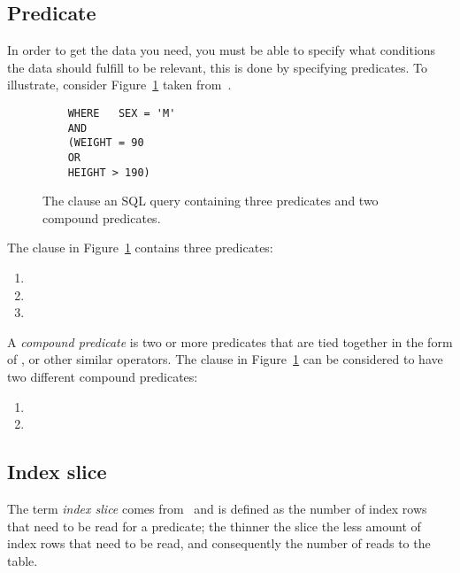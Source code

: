 \subsection*{Predicate}
In order to get the data you need, you must be able to specify what conditions
the data should fulfill to be relevant, this is done by specifying predicates.
To illustrate, consider Figure~\ref{fig:sql:predicate} taken
from~\cite{lahdenmaki_2005_relational_rdidatodossea}.

\begin{figure}[ht]
  \begin{verbatim}
    WHERE   SEX = 'M'
    AND
    (WEIGHT = 90
    OR
    HEIGHT > 190)
  \end{verbatim}
  \caption[The  clause of a query containing three predicates and two
  compound predicates]{The  clause an SQL query containing three
    predicates and two compound predicates.}\label{fig:sql:predicate}
\end{figure}

The  clause in Figure~\ref{fig:sql:predicate} contains three
predicates:
\begin{enumerate}
\item {}
\item {}
\item {}
\end{enumerate}

A \textit{compound predicate} is two or more predicates that are tied together
in the form of ,  or other similar operators. The 
clause in Figure~\ref{fig:sql:predicate} can be considered to have two different
compound predicates:
\begin{enumerate}
\item {}
\item {}
\end{enumerate}

\subsection*{Index slice}
The term \textit{index slice} comes
from~\cite{lahdenmaki_2005_relational_rdidatodossea} and is defined as the
number of index rows that need to be read for a predicate; the thinner the slice
the less amount of index rows that need to be read, and consequently the number
of reads to the table.

